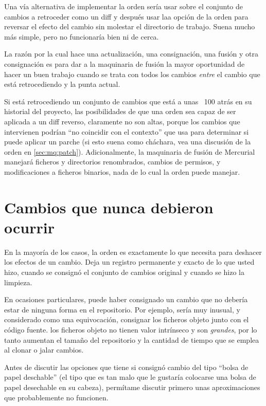 Una vía alternativa de implementar la orden  sería usar
 sobre el conjunto de cambios a retroceder como un diff
y después usar laa opción  de la orden
 para reversar el efecto del cambio sin molestar el
directorio de trabajo.  Suena mucho más simple, pero no funcionaría
bien ni de cerca.

La razón por la cual  hace una actualización, una
consignación, una fusión y otra consignación es para dar a la
maquinaria de fusión la mayor oportunidad de hacer un buen trabajo
cuando se trata con todos los cambios \emph{entre} el cambio que está
retrocediendo y la punta actual.

Si está retrocediendo un conjunto de cambios que está a unas ~100
atrás en su historial del proyecto, las posibilidades de que una orden
 sea capaz de ser aplicada a un diff reverso,
claramente no son altas, porque los cambios que intervienen podrían
``no coincidir con el contexto'' que  usa  para
determinar si puede aplicar un parche (si esto suena como cháchara,
vea una discusión de la orden  en \ref{sec:mq:patch}).
Adicionalmente, la maquinaria de fusión de Mercurial manejará ficheros
y directorios renombrados, cambios de permisos, y modificaciones a
ficheros binarios, nada de lo cual la orden  puede manejar.

\section{Cambios que nunca debieron ocurrir}
\label{sec:undo:aaaiiieee}

En la mayoría de los casos, la orden  es exactamente lo
que necesita para deshacer los efectos de un cambio.  Deja un registro
permanente y exacto de lo que usted hizo, cuando se consignó el
conjunto de cambios original y cuando se hizo la limpieza.

En ocasiones particulares, puede haber consignado un cambio que no
debería estar de ninguna forma en el repositorio.  Por ejemplo, sería
muy inusual, y considerado como una equivocación, consignar los
ficheros objeto junto con el código fuente. los ficheros objeto no
tienen valor intrínseco y son \emph{grandes}, por lo tanto aumentan el
tamaño del repositorio y la cantidad de tiempo que se emplea al clonar
o jalar cambios.

Antes de discutir las opciones que tiene si consignó cambio del tipo 
``bolsa de papel deschable'' (el tipo que es tan malo que le gustaría
colocarse una bolsa de papel desechable en su cabeza), permítame
discutir primero unas aproximaciones que probablemente no funcionen.

